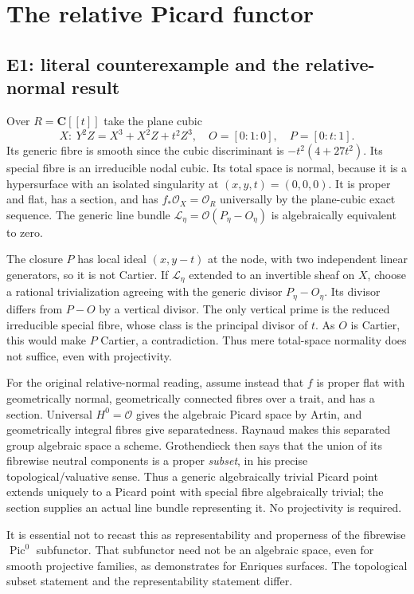 \section{The relative Picard functor}
\subsection{E1: literal counterexample and the relative-normal result}

Over $R=\mathbf C[[t]]$ take the plane cubic
\[
 X:\ Y^2Z=X^3+X^2Z+t^2Z^3,
 \quad O=[0:1:0],\quad P=[0:t:1].
\]
Its generic fibre is smooth since the cubic discriminant is
$-t^2(4+27t^2)$. Its special fibre is an irreducible nodal cubic. Its total
space is normal, because it is a hypersurface with an isolated singularity
at $(x,y,t)=(0,0,0)$. It is proper and flat, has a section, and has
$f_*\mathcal O_X=\mathcal O_R$ universally by the plane-cubic exact sequence.
The generic line bundle $\mathcal L_\eta=\mathcal O(P_\eta-O_\eta)$ is
algebraically equivalent to zero.

The closure $P$ has local ideal $(x,y-t)$ at the node, with two independent
linear generators, so it is not Cartier. If $\mathcal L_\eta$ extended to
an invertible sheaf on $X$, choose a rational trivialization agreeing with
the generic divisor $P_\eta-O_\eta$. Its divisor differs from $P-O$ by a
vertical divisor. The only vertical prime is the reduced irreducible special
fibre, whose class is the principal divisor of $t$. As $O$ is Cartier, this
would make $P$ Cartier, a contradiction. Thus mere total-space normality does
not suffice, even with projectivity.

For the original relative-normal reading, assume instead that $f$ is proper
flat with geometrically normal, geometrically connected fibres over a trait,
and has a section. Universal $H^0=\mathcal O$ gives the algebraic Picard space
by Artin, and geometrically integral fibres give separatedness. Raynaud
\cite[Theorem~3.3.1, p.~40]{Raynaud1970} makes this separated group algebraic
space a scheme. Grothendieck \cite[Theorem~1.1(i), Corollary~2.3]{Grothendieck1962VI}
then says that the union of its fibrewise neutral components is a proper
\emph{subset}, in his precise topological/valuative sense. Thus a generic
algebraically trivial Picard point extends uniquely to a Picard point with
special fibre algebraically trivial; the section supplies an actual line
bundle representing it. No projectivity is required.

It is essential not to recast this as representability and properness of
the fibrewise $\operatorname{Pic}^0$ subfunctor. That subfunctor need not be an
algebraic space, even for smooth projective families, as
\cite[Proposition~2.2]{LaurentSchroer2024} demonstrates for Enriques surfaces.
The topological subset statement and the representability statement differ.

